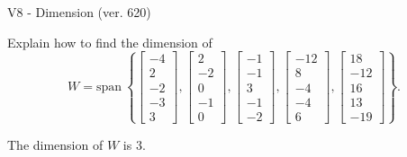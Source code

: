 \begin{exercise}
  \begin{exerciseTitle}V8 - Dimension (ver. 620)\end{exerciseTitle}
  \begin{exerciseStatement}
    Explain how to find the dimension of 
\[W=\mathrm{span}\ \left\{\left[\begin{array}{r}
-4 \\
2 \\
-2 \\
-3 \\
3
\end{array}\right] , \left[\begin{array}{r}
2 \\
-2 \\
0 \\
-1 \\
0
\end{array}\right] , \left[\begin{array}{r}
-1 \\
-1 \\
3 \\
-1 \\
-2
\end{array}\right] , \left[\begin{array}{r}
-12 \\
8 \\
-4 \\
-4 \\
6
\end{array}\right] , \left[\begin{array}{r}
18 \\
-12 \\
16 \\
13 \\
-19
\end{array}\right]\right\}.\]



  \end{exerciseStatement}
  \begin{exerciseAnswer}
   The dimension of \(W\) is  \(3\).
  


  \end{exerciseAnswer}
\end{exercise}
